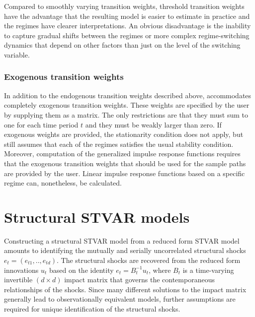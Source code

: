 \documentclass[nojss]{jss}
\begin{document}
Compared to smoothly varying transition weights, threshold transition weights have the advantage that the resulting model is easier to estimate in practice and the regimes have clearer interpretations. An obvious disadvantage is the inability to capture gradual shifts between the regimes or more complex regime-switching dynamics that depend on other factors than just on the level of the switching variable.

\subsubsection{Exogenous transition weights}

In addition to the endogenous transition weights described above,  accommodates completely exogenous transition weights. These weights are specified by the user by supplying them as a matrix. The only restrictions are that they must sum to one for each time period $t$ and they must be weakly larger than zero. If exogenous weights are provided, the stationarity condition does not apply, but  still assumes that each of the regimes satisfies the usual stability condition. Moreover, computation of the generalized impulse response functions requires that the exogenous transition weights that should be used for the sample paths are provided by the user. Linear impulse response functions based on a specific regime can, nonetheless, be calculated.


\section{Structural STVAR models}\label{sec:struct_stvar}
Constructing a structural STVAR model from a reduced form STVAR model amounts to identifying the mutually and serially uncorrelated structural shocks $e_t=(e_{t1},..,e_{td})$. The structural shocks are recovered from the reduced form innovations $u_t$ based on the identity $e_t=B_t^{-1}u_t$, where $B_t$ is a time-varying invertible $(d\times d)$ impact matrix that governs the contemporaneous relationships of the shocks.  Since many different solutions to the impact matrix generally lead to observationally equivalent models, further assumptions are required for unique identification of the structural shocks.
\end{document}
